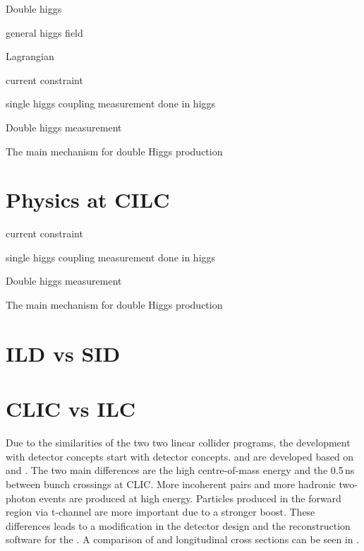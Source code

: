 Double higgs


general higgs field

Lagrangian

current constraint

single higgs coupling measurement done in higgs

Double higgs measurement

The main mechanism for double Higgs production %




\section{Physics at CILC}

current constraint

single higgs coupling measurement done in higgs

Double higgs measurement

The main mechanism for double Higgs production %




\section{ILD vs SID}



\section{CLIC vs ILC}

Due to the similarities of the two two linear collider programs, the development with \CLIC detector concepts start with \ILC detector concepts. \CLICILD and \CLICSiD are developed based on \ILD and \SiD. The two main differences are the high centre-of-mass energy and the 0.5\,ns between bunch crossings at CLIC. More incoherent pairs and more hadronic two-photon events are produced at high energy. Particles produced in the forward region via t-channel are more important due to a stronger boost. These differences leads to a modification in the detector design and the reconstruction software for the \CLIC. A comparison of \CLICILD and \ILD longitudinal cross sections can be seen in .

